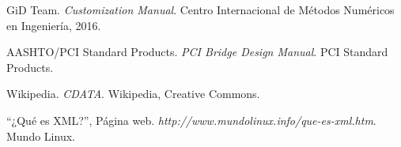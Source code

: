 \documentclass[10pt, a4paper, twocolumn]{article}
\begin{document}

\begin{thebibliography}{1}
GiD Team. 
\textit{Customization Manual}. 
Centro Internacional de Métodos Numéricos en Ingeniería, 2016.

AASHTO/PCI Standard Products. 
\textit{PCI Bridge Design Manual}. 
PCI Standard Products.

Wikipedia.
\textit{CDATA}.
Wikipedia, Creative Commons.

``¿Qué es XML?'', Página web. \textit{http://www.mundolinux.info/que-es-xml.htm}.
Mundo Linux.



\end{thebibliography}
\end{document}
